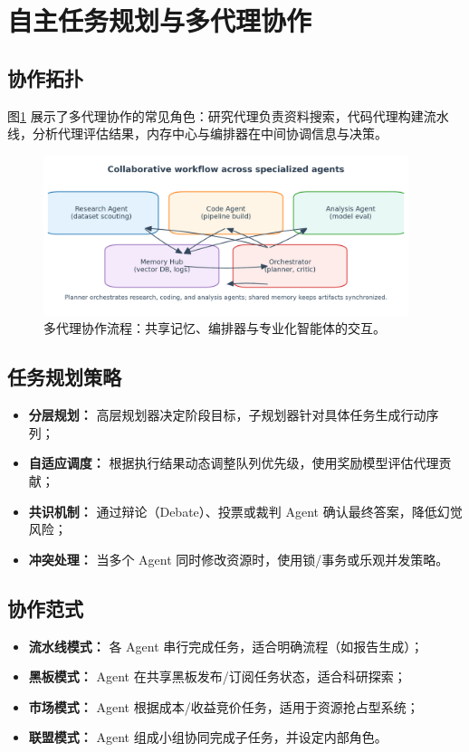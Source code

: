 \documentclass[UTF8,zihao=-4]{ctexart}
\begin{document}
\section{自主任务规划与多代理协作}
\subsection{协作拓扑}
图\ref{fig:agent_collaboration} 展示了多代理协作的常见角色：研究代理负责资料搜索，代码代理构建流水线，分析代理评估结果，内存中心与编排器在中间协调信息与决策。
\begin{figure}[H]
  \centering
  \includegraphics[width=0.95\textwidth]{agent_collaboration.png}
  \caption{多代理协作流程：共享记忆、编排器与专业化智能体的交互。}
  \label{fig:agent_collaboration}
\end{figure}

\subsection{任务规划策略}
\begin{itemize}
  \item \textbf{分层规划：} 高层规划器决定阶段目标，子规划器针对具体任务生成行动序列；
  \item \textbf{自适应调度：} 根据执行结果动态调整队列优先级，使用奖励模型评估代理贡献；
  \item \textbf{共识机制：} 通过辩论（Debate）、投票或裁判 Agent 确认最终答案，降低幻觉风险；
  \item \textbf{冲突处理：} 当多个 Agent 同时修改资源时，使用锁/事务或乐观并发策略。
\end{itemize}

\subsection{协作范式}
\begin{itemize}
  \item \textbf{流水线模式：} 各 Agent 串行完成任务，适合明确流程（如报告生成）；
  \item \textbf{黑板模式：} Agent 在共享黑板发布/订阅任务状态，适合科研探索；
  \item \textbf{市场模式：} Agent 根据成本/收益竞价任务，适用于资源抢占型系统；
  \item \textbf{联盟模式：} Agent 组成小组协同完成子任务，并设定内部角色。
\end{itemize}
\end{document}
